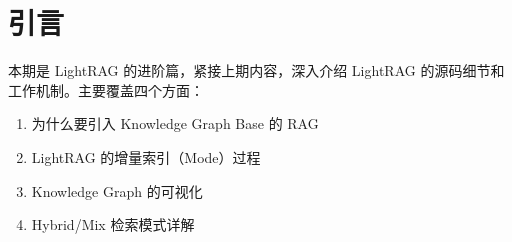 \section{引言}

本期是 LightRAG 的进阶篇，紧接上期内容，深入介绍 LightRAG 的源码细节和工作机制。主要覆盖四个方面：

\begin{enumerate}
    \item 为什么要引入 Knowledge Graph Base 的 RAG
    \item LightRAG 的增量索引（Mode）过程
    \item Knowledge Graph 的可视化
    \item Hybrid/Mix 检索模式详解
\end{enumerate}


